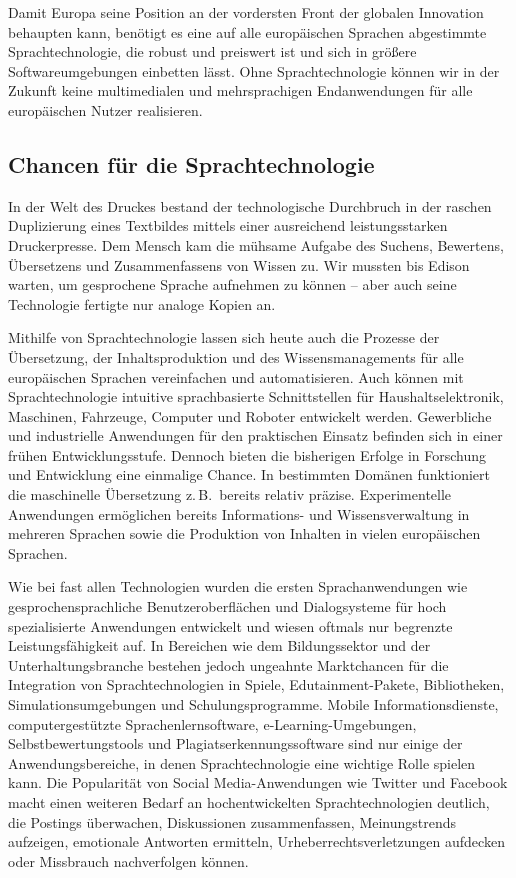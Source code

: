 \documentclass[]{../../metanetpaper}
\begin{document}
\begin{multicols}{2}

Damit Europa seine Position an der vordersten Front der globalen Innovation behaupten kann, benötigt es eine auf alle europäischen Sprachen abgestimmte Sprachtechnologie, die robust und preiswert ist und sich in größere Softwareumgebungen einbetten lässt. Ohne Sprachtechnologie können wir in der Zukunft keine multimedialen und mehrsprachigen Endanwendungen für alle europäischen Nutzer realisieren.

\subsection{Chancen für die Sprachtechnologie}

In der Welt des Druckes bestand der technologische Durchbruch in der raschen Duplizierung eines Textbildes mittels einer ausreichend leistungsstarken Druckerpresse. Dem Mensch kam die mühsame Aufgabe des Suchens, Bewertens, Übersetzens und Zusammenfassens von Wissen zu. Wir mussten bis Edison warten, um gesprochene Sprache aufnehmen zu können – aber auch seine Technologie fertigte nur analoge Kopien an.

Mithilfe von Sprachtechnologie lassen sich heute auch die Prozesse der Übersetzung, der Inhaltsproduktion und des Wissensmanagements für alle europäischen Sprachen vereinfachen und automatisieren. Auch können mit Sprachtechnologie intuitive sprachbasierte Schnittstellen für Haushaltselektronik, Maschinen, Fahrzeuge, Computer und Roboter entwickelt werden. Gewerbliche und industrielle Anwendungen für den praktischen Einsatz befinden sich in einer frühen Entwicklungsstufe. Dennoch bieten die bisherigen Erfolge in Forschung und Entwicklung eine einmalige Chance. In bestimmten Domänen funktioniert die maschinelle Übersetzung z.\,B.~bereits relativ präzise. Experimentelle Anwendungen ermöglichen bereits Informations- und Wissensverwaltung in mehreren Sprachen sowie die Produktion von Inhalten in vielen europäischen Sprachen. 

Wie bei fast allen Technologien wurden die ersten Sprachanwendungen wie gesprochensprachliche Benutzeroberflächen und Dialogsysteme für hoch spezialisierte Anwendungen entwickelt und wiesen oftmals nur begrenzte Leistungsfähigkeit auf. In Bereichen wie dem Bildungssektor und der Unterhaltungsbranche bestehen jedoch ungeahnte Marktchancen für die Integration von Sprachtechnologien in Spiele, Edutainment-Pakete, Bibliotheken, Simulationsumgebungen und Schulungsprogramme. Mobile Informationsdienste, computergestützte Sprachenlernsoftware, e-Learning-Umgebungen, Selbstbewertungstools und Plagiatserkennungssoftware sind nur einige der Anwendungsbereiche, in denen Sprachtechnologie eine wichtige Rolle spielen kann. Die Popularität von Social Media-Anwendungen wie Twitter und Facebook macht einen weiteren Bedarf an hochentwickelten Sprachtechnologien deutlich, die Postings überwachen, Diskussionen zusammenfassen, Meinungstrends aufzeigen, emotionale Antworten ermitteln, Urheberrechtsverletzungen aufdecken oder Missbrauch nachverfolgen können.


\end{multicols}
\end{document}
